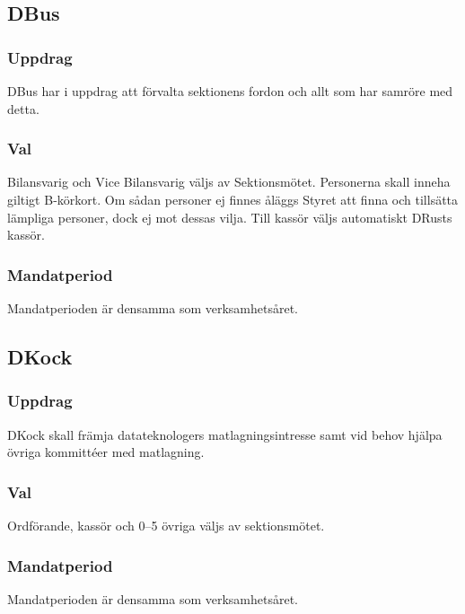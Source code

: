 \subsection{DBus}
\subsubsection{Uppdrag}
DBus har i uppdrag att förvalta sektionens fordon och allt som har samröre med detta.
\subsubsection{Val}
Bilansvarig och Vice Bilansvarig väljs av Sektionsmötet. Personerna skall inneha giltigt B-körkort. Om sådan personer ej finnes åläggs Styret att finna och tillsätta lämpliga personer, dock ej mot dessas vilja. Till kassör väljs automatiskt DRusts kassör.
\subsubsection{Mandatperiod}
Mandatperioden är densamma som verksamhetsåret.





\subsection{DKock}
\subsubsection{Uppdrag}
DKock skall främja datateknologers matlagningsintresse samt vid behov hjälpa övriga kommittéer med matlagning.
\subsubsection{Val}
Ordförande, kassör och 0--5 övriga väljs av sektionsmötet.
\subsubsection{Mandatperiod}
Mandatperioden är densamma som verksamhetsåret.

\newpage
